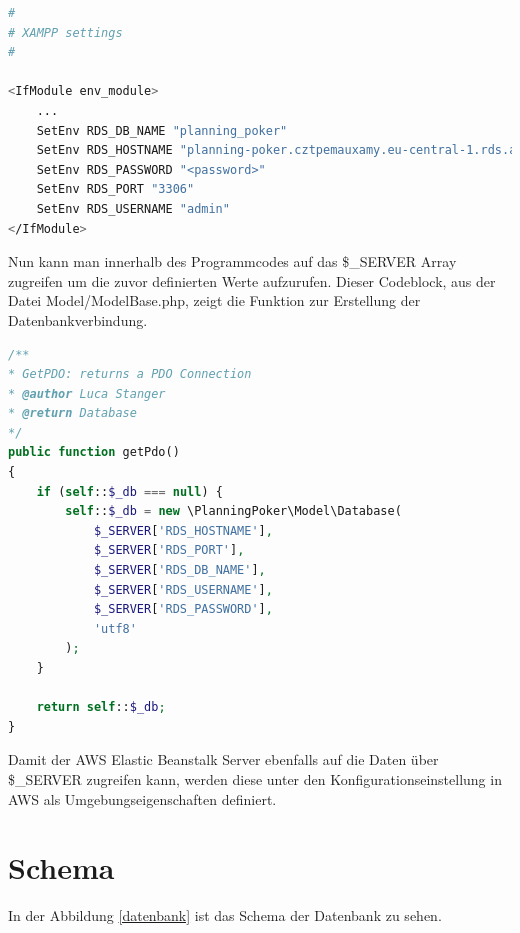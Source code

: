 \begin{lstlisting}[language=bash]
#
# XAMPP settings
#

<IfModule env_module>
    ...
    SetEnv RDS_DB_NAME "planning_poker"
    SetEnv RDS_HOSTNAME "planning-poker.cztpemauxamy.eu-central-1.rds.amazonaws.com"
    SetEnv RDS_PASSWORD "<password>"
    SetEnv RDS_PORT "3306"
    SetEnv RDS_USERNAME "admin"
</IfModule>
\end{lstlisting}

Nun kann man innerhalb des Programmcodes auf das \$\_SERVER Array zugreifen um die zuvor definierten Werte aufzurufen. Dieser Codeblock, aus der Datei Model/ModelBase.php, zeigt die Funktion zur Erstellung der Datenbankverbindung. 

\begin{lstlisting}[language=PHP]
/**
* GetPDO: returns a PDO Connection
* @author Luca Stanger
* @return Database
*/
public function getPdo()
{
	if (self::$_db === null) {
		self::$_db = new \PlanningPoker\Model\Database(
			$_SERVER['RDS_HOSTNAME'],
			$_SERVER['RDS_PORT'],
			$_SERVER['RDS_DB_NAME'],
			$_SERVER['RDS_USERNAME'],
			$_SERVER['RDS_PASSWORD'],
			'utf8'
		);
	}

	return self::$_db;
}
\end{lstlisting}

Damit der AWS Elastic Beanstalk Server ebenfalls auf die Daten über \$\_SERVER zugreifen kann, werden diese unter den Konfigurationseinstellung in AWS als Umgebungseigenschaften definiert.

\section{Schema}
In der Abbildung \ref{datenbank} ist das Schema der Datenbank zu sehen.

